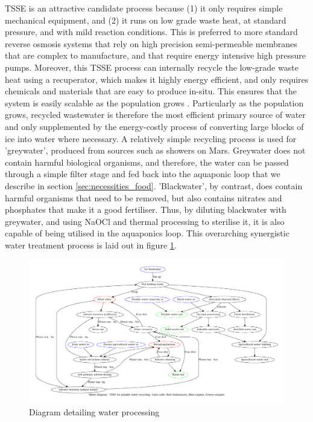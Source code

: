\documentclass[fleqn,10pt]{Stylesheet} %
\begin{document}
 TSSE is an attractive candidate process because (1) it only requires simple mechanical equipment, and (2) it runs on low grade waste heat, at standard pressure, and with mild reaction conditions. This is preferred to more standard reverse osmosis systems that rely on high precision semi-permeable membranes that are complex to manufacture, and that require energy intensive high pressure pumps. Moreover, this TSSE process can internally recycle the low-grade waste heat using a recuperator, which makes it highly energy efficient, and only requires chemicals and materials that are easy to produce in-situ. This ensures that the system is easily scalable as the population grows \cite{ChanheeBoo2019}. Particularly as the population grows, recycled wastewater is therefore the most efficient primary source of water and only supplemented by the energy-costly process of converting large blocks of ice into water where necessary. A relatively simple recycling process is used for 'greywater', produced from sources such as showers on Mars. Greywater does not contain harmful biological organisms, and therefore, the water can be passed through a simple filter stage and fed back into the aquaponic loop that we describe in section \ref{sec:necessities_food}. 'Blackwater', by contrast, does contain harmful organisms that need to be removed, but also contains nitrates and phosphates that make it a good fertiliser. Thus, by diluting blackwater with greywater, and using NaOCl and thermal processing to sterilise it, it is also capable of being utilised in the aquaponics loop. This overarching synergistic water treatment process is laid out in figure \ref{fig:water_diagram}.

\begin{figure}
    \centering
    \includegraphics[width=\linewidth]{figures/fig_water.pdf}
    \caption{Diagram detailing water processing}
    \label{fig:water_diagram}
\end{figure}
\end{document}
